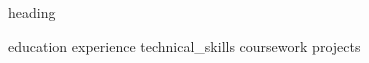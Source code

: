 \documentclass[letterpaper]{article}
\begin{document}
{heading}

\justifying
{education}
{experience}
{technical_skills}
{coursework}
{projects}

\end{document}
